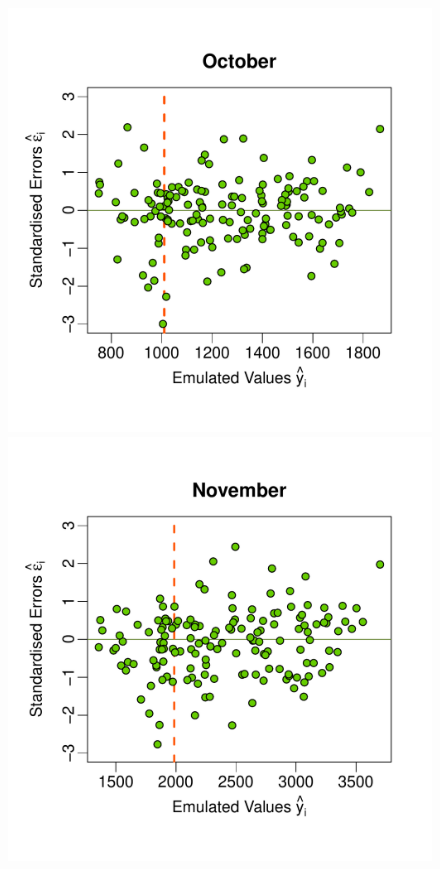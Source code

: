 \documentclass[a4paper, 12pt]{article}
\begin{document}
\begin{figure}
 \includegraphics[width=\scale]{Validation_Plots/Validation_Scatter_10_Oct}\hspace{-1ex}
 \includegraphics[width=\scale]{Validation_Plots/Validation_Scatter_11_Nov}\hspace{-1ex}

\end{figure}
\end{document}
